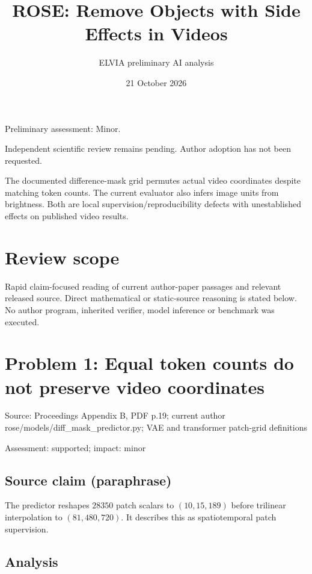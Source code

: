 \documentclass[11pt]{article}
\begin{document}
\title{ROSE: Remove Objects with Side Effects in Videos}

\author{ELVIA preliminary AI analysis}\date{21 October 2026}\maketitle

Preliminary assessment: Minor.\par

Independent scientific review remains pending. Author adoption has not been requested.

The documented difference-mask grid permutes actual video coordinates despite matching token counts. The current evaluator also infers image units from brightness. Both are local supervision/reproducibility defects with unestablished effects on published video results.

\section*{Review scope}

Rapid claim-focused reading of current author-paper passages and relevant released source. Direct mathematical or static-source reasoning is stated below. No author program, inherited verifier, model inference or benchmark was executed.

\section*{Problem 1: Equal token counts do not preserve video coordinates}

Source: Proceedings Appendix B, PDF p.19; current author rose/models/diff\_mask\_predictor.py; VAE and transformer patch-grid definitions

Assessment: supported; impact: minor

\subsection*{Source claim (paraphrase)}

The predictor reshapes \(28350\) patch scalars to \((10,15,189)\) before trilinear interpolation to \((81,480,720)\). It describes this as spatiotemporal patch supervision.

\subsection*{Analysis}
\end{document}
